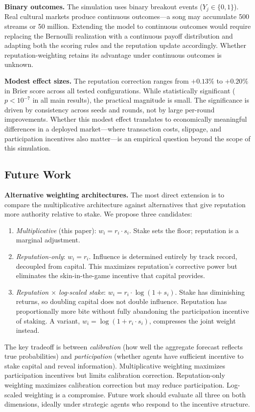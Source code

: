 \documentclass[conference]{IEEEtran}
\begin{document}
\textbf{Binary outcomes.} The simulation uses binary breakout events ($Y_j \in \{0, 1\}$). Real cultural markets produce continuous outcomes---a song may accumulate 500 streams or 50 million. Extending the model to continuous outcomes would require replacing the Bernoulli realization with a continuous payoff distribution and adapting both the scoring rules and the reputation update accordingly. Whether reputation-weighting retains its advantage under continuous outcomes is unknown.

\textbf{Modest effect sizes.} The reputation correction ranges from $+0.13\%$ to $+0.20\%$ in Brier score across all tested configurations. While statistically significant ($p < 10^{-7}$ in all main results), the practical magnitude is small. The significance is driven by consistency across seeds and rounds, not by large per-round improvements. Whether this modest effect translates to economically meaningful differences in a deployed market---where transaction costs, slippage, and participation incentives also matter---is an empirical question beyond the scope of this simulation.

\subsection{Future Work}
\label{sec:limitations-future}

\textbf{Alternative weighting architectures.} The most direct extension is to compare the multiplicative architecture against alternatives that give reputation more authority relative to stake. We propose three candidates:
\begin{enumerate}
    \item \emph{Multiplicative} (this paper): $w_i = r_i \cdot s_i$. Stake sets the floor; reputation is a marginal adjustment.
    \item \emph{Reputation-only}: $w_i = r_i$. Influence is determined entirely by track record, decoupled from capital. This maximizes reputation's corrective power but eliminates the skin-in-the-game incentive that capital provides.
    \item \emph{Reputation $\times$ log-scaled stake}: $w_i = r_i \cdot \log(1 + s_i)$. Stake has diminishing returns, so doubling capital does not double influence. Reputation has proportionally more bite without fully abandoning the participation incentive of staking. A variant, $w_i = \log(1 + r_i \cdot s_i)$, compresses the joint weight instead.
\end{enumerate}
The key tradeoff is between \emph{calibration} (how well the aggregate forecast reflects true probabilities) and \emph{participation} (whether agents have sufficient incentive to stake capital and reveal information). Multiplicative weighting maximizes participation incentives but limits calibration correction. Reputation-only weighting maximizes calibration correction but may reduce participation. Log-scaled weighting is a compromise. Future work should evaluate all three on both dimensions, ideally under strategic agents who respond to the incentive structure.
\end{document}
